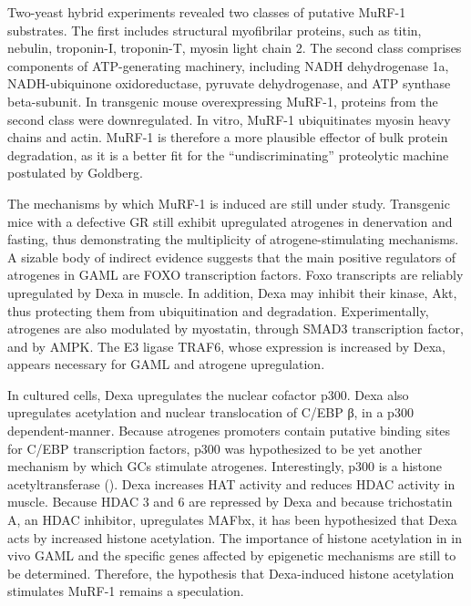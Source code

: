 \documentclass[12pt,english]{report}\usepackage[]{graphicx}\usepackage[]{color}
\begin{document}
Two-yeast hybrid experiments revealed two classes of putative MuRF-1
substrates\citep{witt2005murf-1}. The first includes structural myofibrilar
proteins, such as titin, nebulin, troponin-I, troponin-T, myosin light
chain 2. The second class comprises components of ATP-generating machinery,
including NADH dehydrogenase 1a, NADH-ubiquinone oxidoreductase, pyruvate
dehydrogenase, and ATP synthase beta-subunit. In transgenic mouse
overexpressing MuRF-1, proteins from the second class were downregulated\citep{hirner2008murf1-dependent}.
In vitro, MuRF-1 ubiquitinates myosin heavy chains\citep{clarke2007e3}
and actin\citep{polge2011muscle}. MuRF-1 is therefore a more plausible
effector of bulk protein degradation, as it is a better fit for the
``undiscriminating'' proteolytic machine postulated by Goldberg.

The mechanisms by which MuRF-1 is induced are still under study. Transgenic
mice with a defective GR still exhibit upregulated atrogenes in denervation
and fasting, thus demonstrating the multiplicity of atrogene-stimulating
mechanisms. A sizable body of indirect evidence suggests that the
main positive regulators of atrogenes in GAML are FOXO transcription
factors. Foxo transcripts are reliably upregulated by Dexa in muscle.
In addition, Dexa may inhibit their kinase, Akt, thus protecting them
from ubiquitination and degradation. Experimentally, atrogenes are
also modulated by myostatin, through SMAD3 transcription factor, and
by AMPK. The E3 ligase TRAF6, whose expression is increased by Dexa,
appears necessary for GAML and atrogene upregulation\citep{sun2014traf6}.

In cultured cells, Dexa upregulates the nuclear cofactor p300\citep{yang2005dexamethasone}.
Dexa also upregulates acetylation and nuclear translocation of C/EBP
β, in a p300 dependent-manner\citep{chamberlain2012multiple}. Because
atrogenes promoters contain putative binding sites for C/EBP transcription
factors, p300 was hypothesized to be yet another mechanism by which
GCs stimulate atrogenes. Interestingly, p300 is a histone acetyltransferase
(). Dexa increases HAT
activity and reduces HDAC activity in muscle\citep{alamdari2010sepsis}.
Because HDAC 3 and 6 are repressed by Dexa and because trichostatin
A, an HDAC inhibitor, upregulates MAFbx, it has been hypothesized
that Dexa acts by increased histone acetylation. The importance of
histone acetylation in in vivo GAML and the specific genes affected
by epigenetic mechanisms are still to be determined. Therefore, the
hypothesis that Dexa-induced histone acetylation stimulates MuRF-1
remains a speculation.
\end{document}
